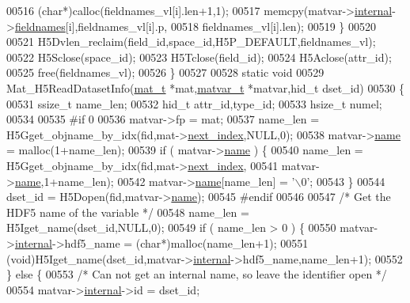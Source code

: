 \begin{DoxyCode}
00516             (\textcolor{keywordtype}{char}*)calloc(fieldnames\_vl[i].len+1,1);
00517         memcpy(matvar->\hyperlink{group___m_a_t_a6e97e3ed9f40c49322c18561c2a94e92}{internal}->\hyperlink{structmatvar__internal_a7574d000bfc98ad4860ae6590b8d4985}{fieldnames}[i],fieldnames\_vl[i].p,
00518             fieldnames\_vl[i].len);
00519     \}
00520 
00521     H5Dvlen\_reclaim(field\_id,space\_id,H5P\_DEFAULT,fieldnames\_vl);
00522     H5Sclose(space\_id);
00523     H5Tclose(field\_id);
00524     H5Aclose(attr\_id);
00525     free(fieldnames\_vl);
00526 \}
00527 
00528 \textcolor{keyword}{static} \textcolor{keywordtype}{void}
00529 Mat\_H5ReadDatasetInfo(\hyperlink{struct__mat__t}{mat\_t} *mat,\hyperlink{group___m_a_t_structmatvar__t}{matvar\_t} *matvar,hid\_t dset\_id)
00530 \{
00531     ssize\_t name\_len;
00532     hid\_t   attr\_id,type\_id;
00533     hsize\_t numel;
00534 
00535 \textcolor{preprocessor}{#if 0}
00536     matvar->fp = mat;
00537     name\_len = H5Gget\_objname\_by\_idx(fid,mat->\hyperlink{struct__mat__t_a0163a12f9735356723bb604992639d9e}{next\_index},NULL,0);
00538     matvar->\hyperlink{group___m_a_t_a5d4b55b041e3b4fb50c04337f05ad909}{name} = malloc(1+name\_len);
00539     \textcolor{keywordflow}{if} ( matvar->\hyperlink{group___m_a_t_a5d4b55b041e3b4fb50c04337f05ad909}{name} ) \{
00540         name\_len = H5Gget\_objname\_by\_idx(fid,mat->\hyperlink{struct__mat__t_a0163a12f9735356723bb604992639d9e}{next\_index},
00541                                          matvar->\hyperlink{group___m_a_t_a5d4b55b041e3b4fb50c04337f05ad909}{name},1+name\_len);
00542         matvar->\hyperlink{group___m_a_t_a5d4b55b041e3b4fb50c04337f05ad909}{name}[name\_len] = \textcolor{charliteral}{'\(\backslash\)0'};
00543     \}
00544     dset\_id = H5Dopen(fid,matvar->\hyperlink{group___m_a_t_a5d4b55b041e3b4fb50c04337f05ad909}{name});
00545 \textcolor{preprocessor}{#endif}
00546 
00547     \textcolor{comment}{/* Get the HDF5 name of the variable */}
00548     name\_len = H5Iget\_name(dset\_id,NULL,0);
00549     \textcolor{keywordflow}{if} ( name\_len > 0 ) \{
00550         matvar->\hyperlink{group___m_a_t_a6e97e3ed9f40c49322c18561c2a94e92}{internal}->hdf5\_name = (\textcolor{keywordtype}{char}*)malloc(name\_len+1);
00551         (void)H5Iget\_name(dset\_id,matvar->\hyperlink{group___m_a_t_a6e97e3ed9f40c49322c18561c2a94e92}{internal}->hdf5\_name,name\_len+1);
00552     \} \textcolor{keywordflow}{else} \{
00553         \textcolor{comment}{/* Can not get an internal name, so leave the identifier open */}
00554         matvar->\hyperlink{group___m_a_t_a6e97e3ed9f40c49322c18561c2a94e92}{internal}->id = dset\_id;

\end{DoxyCode}
